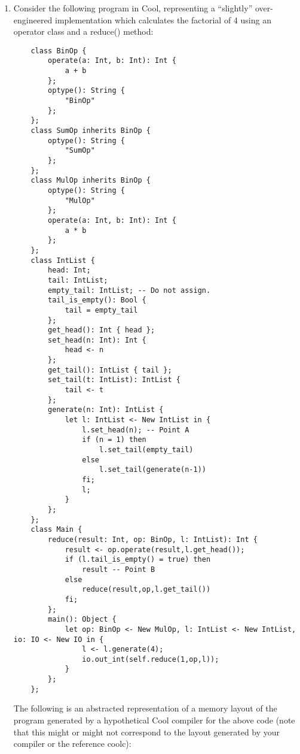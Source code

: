 \documentclass[11pt]{article}
\begin{document}
\begin{enumerate}
  \item  Consider the following program in Cool, representing a ``slightly'' over-engineered implementation which calculates the factorial of 4 using an operator class and a reduce() method:
  \begin{lstlisting}
    class BinOp {
        operate(a: Int, b: Int): Int {
            a + b
        };
        optype(): String {
            "BinOp"
        };
    };
    class SumOp inherits BinOp { 
        optype(): String {
            "SumOp"
        };
    };
    class MulOp inherits BinOp {
        optype(): String {
            "MulOp"
        };
        operate(a: Int, b: Int): Int {
            a * b
        };
    };
    class IntList {
        head: Int;
        tail: IntList;
        empty_tail: IntList; -- Do not assign.
        tail_is_empty(): Bool {
            tail = empty_tail
        };
        get_head(): Int { head };
        set_head(n: Int): Int {
            head <- n
        };
        get_tail(): IntList { tail };
        set_tail(t: IntList): IntList {
            tail <- t
        };
        generate(n: Int): IntList {
            let l: IntList <- New IntList in {
                l.set_head(n); -- Point A
                if (n = 1) then
                    l.set_tail(empty_tail)
                else
                    l.set_tail(generate(n-1))
                fi;
                l;
            }
        };
    };
    class Main {
        reduce(result: Int, op: BinOp, l: IntList): Int {
            result <- op.operate(result,l.get_head());
            if (l.tail_is_empty() = true) then
                result -- Point B
            else
                reduce(result,op,l.get_tail())
            fi;
        };
        main(): Object {
            let op: BinOp <- New MulOp, l: IntList <- New IntList, io: IO <- New IO in {
                l <- l.generate(4); 
                io.out_int(self.reduce(1,op,l));
            }
        };
    };
  \end{lstlisting}
  
  The following is an abstracted representation of a memory layout of the program generated by a hypothetical Cool compiler for the above code (note that this might or might not correspond to the layout generated by your compiler or the reference coolc):
  

\end{enumerate}
\end{document}
